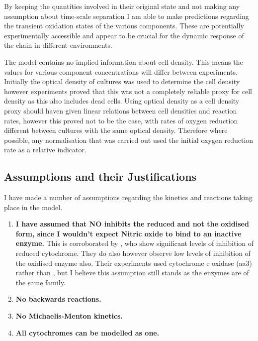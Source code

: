 By keeping the quantities involved in their original state and not making any assumption about time-scale separation I am able to make predictions regarding the transient oxidation states of the various components. These are potentially experimentally accessible and appear to be crucial for the dynamic response of the chain in different environments.

The model contains no implied information about cell density. This means the values for various component concentrations will differ between experiments. Initially the optical density of cultures was used to determine the cell density however experiments proved that this was not a completely reliable proxy for cell density as this also includes dead cells. Using optical density as a cell density proxy should haven given linear relations between cell densities and reaction rates, however this proved not to be the case, with rates of oxygen reduction different between cultures with the same optical density. Therefore where possible, any normalisation that was carried out used the initial oxygen reduction rate as a relative indicator.

\subsection{Assumptions and their Justifications}
I have made a number of assumptions regarding the kinetics and reactions taking place in the model.
\begin{enumerate}
 \item {\bf I have assumed that NO inhibits the reduced \cbbthree{} and not the oxidised form, since I wouldn't expect Nitric oxide to bind to an inactive enzyme.} This is corroborated by \citet{Giuffre2000}, who show significant levels of inhibition of reduced cytochrome. They do also however observe low levels of inhibition of the oxidised enzyme also. Their experiments used cytochrome c oxidase (aa3) rather than \cbbthree{}, but I believe this assumption still stands as the enzymes are of the same family.
 \item {\bf No backwards reactions.}
 \item {\bf No Michaelis-Menton kinetics.}
 \item {\bf All cytochromes can be modelled as one.}
\end{enumerate}


